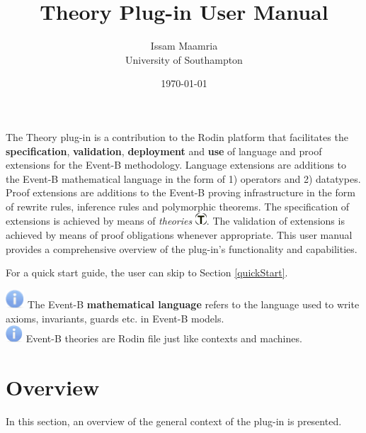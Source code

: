 \documentclass{article}      %
\title{Theory Plug-in User Manual}  %
\author{Issam Maamria \\ University of Southampton}      %
\date{\today}
\begin{document}

\maketitle
The Theory plug-in is a contribution to the Rodin platform that facilitates the \textbf{specification}, \textbf{validation}, \textbf{deployment} and \textbf{use} of language and proof extensions for the Event-B methodology. Language extensions are additions to the Event-B mathematical language in the form of 1) operators and 2) datatypes. Proof extensions are additions to the Event-B proving infrastructure in the form of rewrite rules, inference rules and polymorphic theorems. The specification of extensions is achieved by means of \textit{theories} \includegraphics{images/thy.png}. The validation of extensions is achieved by means of proof obligations whenever appropriate. This user manual provides a comprehensive overview of the plug-in's functionality and capabilities.
\par
For a quick start guide, the user can skip to Section \ref{quickStart}.

\includegraphics[width=7mm]{images/info.png} The Event-B \textbf{mathematical language} refers to the language used to write axioms, invariants, guards etc. in Event-B models.\\

\includegraphics{images/info.png} Event-B theories are Rodin file just like contexts and machines.

\section{Overview}
In this section, an overview of the general context of the plug-in is presented.
\end{document}
